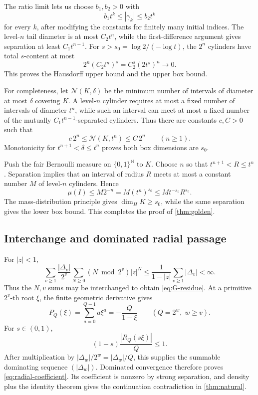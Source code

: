 The ratio limit lets us choose \(b_1,b_2>0\) with
\[
  b_1t^k\le|\gamma_k|\le b_2t^k
\]
for every \(k\), after modifying the constants for finitely many initial
indices.  The level-\(n\) tail diameter is at most
\(C_2t^n\), while the first-difference argument gives separation at least
\(C_1t^{n-1}\).  For \(s>s_0=\log2/(-\log t)\), the \(2^n\) cylinders have
total \(s\)-content at most
\[
  2^n(C_2t^n)^s=C_2^s(2t^s)^n\longrightarrow0.
\]
This proves the Hausdorff upper bound and the upper box bound.

For completeness, let \(\mathcal N(K,\delta)\) be the minimum number of
intervals of diameter at most \(\delta\) covering \(K\).  A level-\(n\)
cylinder requires at most a fixed number of intervals of diameter \(t^n\),
while such an interval can meet at most a fixed number of the mutually
\(C_1t^{n-1}\)-separated cylinders.  Thus there are constants \(c,C>0\)
such that
\[
  c\,2^n\le \mathcal N(K,t^n)\le C\,2^n \qquad(n\ge1).
\]
Monotonicity for \(t^{n+1}<\delta\le t^n\) proves both box dimensions are
\(s_0\).

Push the fair Bernoulli measure on \(\{0,1\}^{\mathbb N}\) to \(K\).
Choose \(n\) so that \(t^{n+1}<R\le t^n\).  Separation implies that an
interval of radius \(R\) meets at most a constant number \(M\) of
level-\(n\) cylinders.  Hence
\[
  \mu(I)\le M2^{-n}=M(t^n)^{s_0}
  \le Mt^{-s_0}R^{s_0}.
\]
The mass-distribution principle gives \(\dim_HK\ge s_0\), while the same
separation gives the lower box bound.  This completes the proof of
\cref{thm:golden}.

\subsection{Interchange and dominated radial passage}

For \(|z|<1\),
\[
  \sum_{v\ge1}\frac{|\Delta_v|}{2^v}
  \sum_{N\ge0}(N\bmod2^v)|z|^N
  \le\frac1{1-|z|}\sum_{v\ge1}|\Delta_v|<\infty.
\]
Thus the \(N,v\) sums may be interchanged to obtain
\eqref{eq:G-residue}.  At a primitive \(2^v\)-th root \(\xi\), the finite
geometric derivative gives
\[
  P_Q(\xi)=\sum_{a=0}^{Q-1}a\xi^a=-\frac Q{1-\xi}
  \qquad(Q=2^w,\;w\ge v).
\]
For \(s\in(0,1)\),
\[
  (1-s)\frac{|R_Q(s\xi)|}{Q}\le1.
\]
After multiplication by \(|\Delta_w|/2^w=|\Delta_w|/Q\), this supplies the
summable dominating sequence \((|\Delta_w|)\).  Dominated convergence
therefore proves \eqref{eq:radial-coefficient}.  Its coefficient is nonzero
by strong separation, and density plus the identity theorem gives the
continuation contradiction in \cref{thm:natural}.
